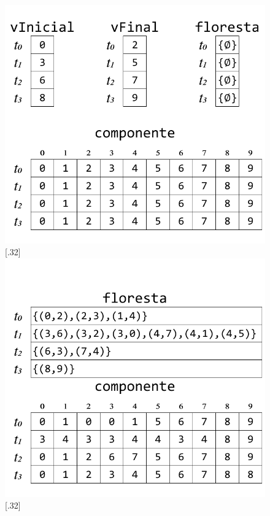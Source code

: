 \documentclass[12pt]{article}
\begin{document}
\begin{figure}[htp!]
{		\includegraphics[width=\linewidth]{figC.pdf}
	}
	\subcaptionbox{}[.32\textwidth]
	{
		\includegraphics[width=\linewidth]{figD.pdf}
	}
	\subcaptionbox{}[.32\textwidth]
	{
}
\end{figure}
\end{document}
